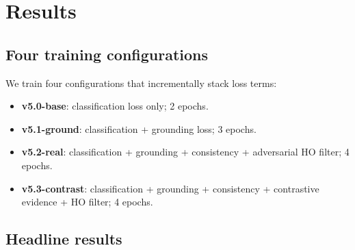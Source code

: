 \documentclass[pmlr]{jmlr}
\begin{document}
\section{Results}

\subsection{Four training configurations}

We train four configurations that incrementally stack loss terms:
\begin{itemize}
\item \textbf{v5.0-base}: classification loss only; 2 epochs.
\item \textbf{v5.1-ground}: classification + grounding loss; 3 epochs.
\item \textbf{v5.2-real}: classification + grounding + consistency + adversarial HO filter; 4 epochs.
\item \textbf{v5.3-contrast}: classification + grounding + consistency + contrastive evidence + HO filter; 4 epochs.
\end{itemize}

\subsection{Headline results}
\end{document}
